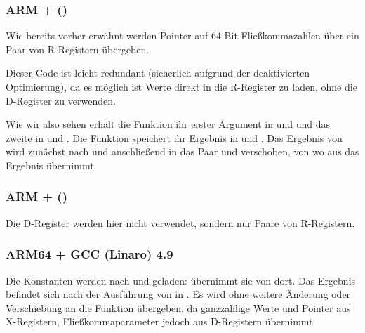 \subsubsection{ARM + \NonOptimizingXcodeIV (\ThumbTwoMode)}
\label{FPU_passing_floats_ARM}


Wie bereits vorher erwähnt werden Pointer auf 64-Bit-Fließkommazahlen über ein
Paar von R-Registern übergeben.

Dieser Code ist leicht redundant (sicherlich aufgrund der deaktivierten
Optimierung), da es möglich ist Werte direkt in die R-Register zu laden, ohne
die D-Register zu verwenden.

Wie wir also sehen erhält die  Funktion ihr erster Argument in
 und  und das zweite in  und . Die Funktion
speichert ihr Ergebnis in  und . 
Das Ergebnis von  wird zunächst nach  und
anschließend in das Paar  und  verschoben, von wo aus \printf das
Ergebnis übernimmt. 

\subsubsection{ARM + \NonOptimizingKeilVI (\ARMMode)}



Die D-Register werden hier nicht verwendet, sondern nur Paare von R-Registern.

\subsubsection{ARM64 + \Optimizing GCC (Linaro) 4.9}



Die Konstanten werden nach  und  geladen:  übernimmt
sie von dort. Das Ergebnis befindet sich nach der Ausführung von  in
. 
Es wird ohne weitere Änderung oder Verschiebung an die Funktion \prinft
übergeben, da \printf ganzzahlige Werte und Pointer aus X-Registern,
Fließkommaparameter jedoch aus D-Registern übernimmt.

